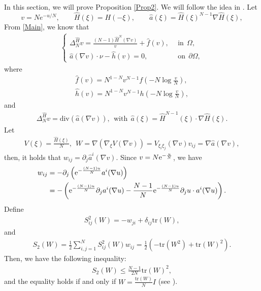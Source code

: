 \documentclass[reqno, 11pt]{amsart} %
\numberwithin{equation}{section}
\theoremstyle{definition}
\newcommand{\pa}{\partial}
\newcommand{\e}{\textup{e}}
\begin{document}
In this section, we will prove Proposition \ref{Prop2}. We will follow the idea in \cite{CCR2021}. Let
\[
       v=Ne^{-u/N},\qquad \widehat H(\xi)=H(-\xi),\qquad
       \widehat a(\xi)=\widehat H(\xi)^{N-1}\nabla\widehat H(\xi),
\]
From \eqref{Main}, we know that
\begin{align}\label{v-equation}
    \begin{cases}
        \Delta_N^{\hat{H}} v = \frac{(N-1)\hat{H}^N(\nabla v)}{v} + \hat{f}(v),  \ \ &\text{in} \ \ \Omega, \\
        \hat{a}(\nabla v) \cdot \nu - \hat{h}(v) = 0 , \ \ &\text{on} \ \ \partial \Omega,
    \end{cases}
\end{align}
where
\begin{align*}
    \hat{f}(v) = N^{1-N} v^{N-1} f\left(-N\log \frac{v}{N}\right), \\  \hat{h}(v) = N^{1-N} v^{N-1} h\left(-N\log \frac{v}{N}\right),
\end{align*}
and
\begin{align*}
    \Delta_N^{\hat{H}} v = \text{div}(\hat{a}(\nabla v)), \ \ \text{with}\ \ \hat{a}(\xi) = \hat{H}^{N -1}(\xi) \cdot \nabla \hat{H}(\xi).
\end{align*}
Let
\begin{align*}
    V(\xi) = \frac{\hat{H}(\xi)}{N} , \ \ W = \nabla(\nabla_{\xi} V(\nabla v)) = V_{\xi_i \xi_j}(\nabla v) v_{ij} = \nabla \hat{a}(\nabla v),
\end{align*}
then, it holds that $ w_{ij} = \partial_j \hat{a}^i(\nabla v) $. Since $ v = N \e^{-\frac{u}{N}}$, we have
\begin{align*}
    w_{ij} & = - \partial_j \left( \e^{-\frac{(N-1)u}{N}} a^i(\nabla u) \right) \\
    & =- \left( \e^{-\frac{(N-1)u}{N}} \pa_ja^i(\nabla u)  - \frac{N-1}{N} \e^{-\frac{(N-1)u}{N}} \pa_j u \cdot a^i(\nabla u)\right).
\end{align*}
Define
\begin{align*}
    S^2_{ij}(W) = - w_{ji} + \delta_{ij} \text{tr}(W),
\end{align*}
and
\begin{align*}
    S_2(W) = \frac{1}{2} \sum_{i,j =1}^N S^2_{ij}(W) w_{ij} = \frac{1}{2}(-\text{tr}(W^2) + \text{tr}(W)^2).
\end{align*}
Then, we have the following  inequality:
\begin{align}\label{Newton}
    S_2(W) \leq \frac{N-1}{2N} \text{tr}(W)^2,
\end{align}
and the equality holds if and only if $W = \frac{\text{tr}(W)}{N} I$ (see \cite{CS2009}).
\end{document}
